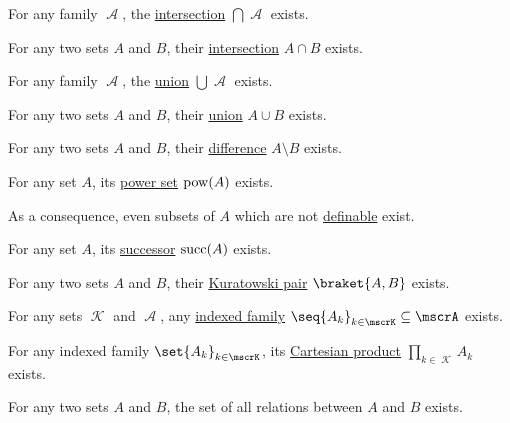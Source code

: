 \begin{proposition}
\begin{thmenum}
     For any  family \( \mscrA \), the \hyperref[def:basic_set_operations/intersection]{intersection} \( \bigcap \mscrA \) exists.

     For any two sets \( A \) and \( B \), their \hyperref[def:basic_set_operations/intersection]{intersection} \( A \cap B \) exists.

     For any family \( \mscrA \), the \hyperref[def:basic_set_operations/union]{union} \( \bigcup \mscrA \) exists.

     For any two sets \( A \) and \( B \), their \hyperref[def:basic_set_operations/union]{union} \( A \cup B \) exists.

     For any two sets \( A \) and \( B \), their \hyperref[def:basic_set_operations/difference]{difference} \( A \setminus B \) exists.

     For any set \( A \), its \hyperref[def:basic_set_operations/power_set]{power set} \( \operatorname{pow}(A) \) exists.

    As a consequence, even subsets of \( A \) which are not \hyperref[def:first_order_definability]{definable} exist.

     For any set \( A \), its \hyperref[def:ordinal_successor]{successor} \( \operatorname{succ}(A) \) exists.

     For any two sets \( A \) and \( B \), their \hyperref[def:cartesian_product/kuratowski_pair]{Kuratowski pair} \( \braket{ A, B } \) exists.

     For any sets \( \mscrK \) and \( \mscrA \), any \hyperref[def:cartesian_product/indexed_family]{indexed family} \( \seq{ A_k }_{k \in \mscrK} \subseteq \mscrA \) exists.

     For any indexed family \( \set{ A_k }_{k \in \mscrK} \), its \hyperref[def:cartesian_product]{Cartesian product} \( \prod_{k \in \mscrK} A_k \) exists.

     For any two sets \( A \) and \( B \), the set of all relations between \( A \) and \( B \) exists.


\end{thmenum}
\end{proposition}
